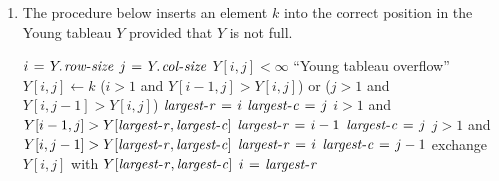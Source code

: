 \begin{enumerate}[\thechapter-1]
\begin{enumerate}[\it a.]
\begin{codebox}
\li \If $p > \attrib{Y}{row-size}$ or $q > \attrib{Y}{col-size}$
\li \Then
          \Error ``out of bound''
    \End
\li $\id{min} \gets Y[p, q]$
\li \If $p \isequal \attrib{Y}{row-size}$
\li \Then
          \If $q \isequal \attrib{Y}{col-size}$
\li       \Then
                $\id{new-min} \gets \infty$
\li       \Else $\id{new-min} \gets \proc{Extract-Min}(Y, p, q + 1)$
          \End
\li \Else
\li       \If $q \isequal \attrib{Y}{col-size}$
\li       \Then
                $\id{new-min} \gets \proc{Extract-Min}(Y, p + 1, q)$
\li       \Else
\li             \If $Y[p + 1, q] \leq Y[p, q + 1]$
\li             \Then
                      $\id{new-min} \gets \proc{Extract-Min}(Y, p + 1, q)$
\li             \Else $\id{new-min} \gets \proc{Extract-Min}(Y, p, q + 1)$
                \End
          \End
    \End
\li $Y[p, q] \gets \id{new-min}$
\li \Return $\id{min}$
\end{codebox}
The problem size is characterized by $\attrib{Y}{row-size}$ and $\attrib{Y}{col-size}$. Let $m = \attrib{Y}{row-size}$ and $n = \attrib{Y}{col-size}$, then
\[
(\mbox{running time of problem of size \mathmode{(m, n)}}) = (\mbox{running time of problem of size \mathmode{(m, n - 1)}}) + \bigoh{1}
\]
or
\[
(\mbox{running time of problem of size \mathmode{(m, n)}}) = (\mbox{running time of problem of size \mathmode{(m - 1, n)}}) + \bigoh{1},
\]
provided that $m > 1$ or $n > 1$.
\item The procedure below inserts an element $k$ into the correct position in the Young tableau $Y$ provided that $Y$ is not full.
\begin{codebox}
\li $i \gets \attrib{Y}{row-size}$
\li $j \gets \attrib{Y}{col-size}$
\li \If $Y[i, j] < \infty$
\li \Then
          \Error ``Young tableau overflow''
    \End
\li $Y[i, j] \gets k$
\li \While ($i > 1$ and $Y[i - 1, j] > Y[i, j]$) or ($j > 1$ and $Y[i, j - 1] > Y[i, j]$) \label{li:while-loop-start-for-insert}
\li \Do
         $\id{largest-r} \gets i$
\li      $\id{largest-c} \gets j$
\li      \If $i > 1$ and $Y[i - 1, j] > Y[\id{largest-r}, \id{largest-c}]$
\li      \Then
               $\id{largest-r} \gets i - 1$
\li            $\id{largest-c} \gets j$
         \End
\li      \If $j > 1$ and $Y[i, j - 1] > Y[\id{largest-r}, \id{largest-c}]$
\li      \Then
               $\id{largest-r} \gets i$
\li            $\id{largest-c} \gets j - 1$
         \End
\li      exchange $Y[i, j]$ with $Y[\id{largest-r}, \id{largest-c}]$
\li      $i \gets \id{largest-r}$

\end{codebox}
\end{enumerate}
\end{enumerate}
